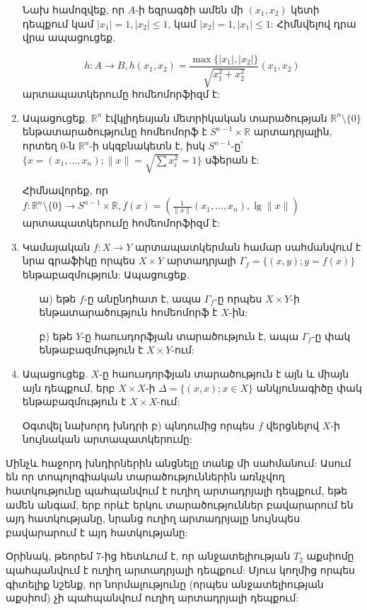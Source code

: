 \begin{enumerate}[label=\thesection.\arabic*.]
\begin{hint}
Նախ համոզվեք, որ $A$-ի եզրագծի ամեն մի $(x_1, x_2)$ կետի դեպքում կամ $|x_1|=1, |x_2| \le 1$, կամ $|x_2|=1, |x_1| \le 1$: Հիմնվելով դրա վրա ապացուցեք. 


\[
h: A \to B, h(x_1, x_2) = \frac{\max\{|x_1|, |x_2|\}}{\sqrt{x_1^2+x_2^2}}(x_1, x_2)
\] 
արտապատկերումը հոմեոմորֆիզմ է:
\end{hint}

\item Ապացուցեք. $\mathbb{R}^n$ էվկլիդեսյան մետրիկական տարածության $\mathbb{R}^n \setminus \{0\}$ ենթատարածությունը հոմեոմորֆ է $S^{n-1} \times \mathbb{R}$ արտադրյալին, որտեղ $0$-ն $\mathbb{R}^n$-ի սկզբնակետն է, իսկ $S^{n-1}$-ը՝ $\{x=(x_1, \dots, x_n); \|x\| = \sqrt{\sum x_i^2}=1\}$ սֆերան է:

\begin{hint}
Հիմնավորեք, որ $f: \mathbb{R}^n \setminus \{0\} \to S^{n-1} \times \mathbb{R}, f(x)=(\frac{1}{\|x\|}(x_1, \dots, x_n), \lg \|x\|)$ արտապատկերումը հոմեոմորֆիզմ է:
\end{hint}

\item Կամայական $f: X \to Y$ արտապատկերման համար սահմանվում է նրա գրաֆիկը որպես $X \times Y$ արտադրյալի $\Gamma_f = \{(x,y); y=f(x)\}$ ենթաբազմություն: Ապացուցեք.
\begin{enumerate}
    \item[ա)] եթե $f$-ը անընդհատ է, ապա $\Gamma_f$-ը որպես $X \times Y$-ի ենթատարածություն հոմեոմորֆ է $X$-ին:
    \item[բ)] եթե $Y$-ը հաուսդորֆյան տարածություն է, ապա $\Gamma_f$-ը փակ ենթաբազմություն է $X \times Y$-ում:
\end{enumerate}

\item Ապացուցեք. $X$-ը հաուսդորֆյան տարածություն է այն և միայն այն դեպքում, երբ $X \times X$-ի $\Delta = \{(x,x); x \in X\}$ անկյունագիծը փակ ենթաբազմություն է $X \times X$-ում:

\begin{hint}
Օգտվել նախորդ խնդրի բ) պնդումից որպես $f$ վերցնելով $X$-ի նույնական արտապատկերումը:
\end{hint}

\end{enumerate}

\par Մինչև հաջորդ խնդիրներին անցնելը տանք մի սահմանում: Ասում են որ տոպոլոգիական տարածություններին առնչվող հատկությունը պահպանվում է ուղիղ արտադրյալի դեպքում, եթե ամեն անգամ, երբ որևէ երկու տարածություններ բավարարում են այդ հատկությանը, նրանց ուղիղ արտադրյալը նույնպես բավարարում է այդ հատկությանը:
\par Օրինակ, թեորեմ 7-ից հետևում է, որ անջատելիության $T_2$ աքսիոմը պահպանվում է ուղիղ արտադրյալի դեպքում: Մյուս կողմից որպես գիտելիք նշենք, որ նորմալությունը (որպես անջատելիության աքսիոմ) չի պահպանվում ուղիղ արտադրյալի դեպքում:

